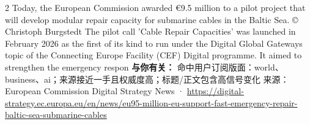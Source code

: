 \documentclass[10.5pt]{ctexart}
\begin{document}
\begin{multicols}{2}
Today, the European Commission awarded €9.5 million to a pilot project that will develop modular repair capacity for submarine cables in the Baltic Sea. © Christoph Burgstedt The pilot call 'Cable Repair Capacities' was launched in February 2026 as the first of its kind to run under the Digital Global Gateways topic of the Connecting Europe Facility (CEF) Digital programme. It aimed to strengthen the emergency respon
\textbf{与你有关：} 命中用户订阅版面：world、business、ai；来源接近一手且权威度高；标题/正文包含高信号变化
{\footnotesize\color{ormuted} 来源：European Commission Digital Strategy News · \url{https://digital-strategy.ec.europa.eu/en/news/eu95-million-eu-support-fast-emergency-repair-baltic-sea-submarine-cables}}
\end{multicols}
\end{document}
